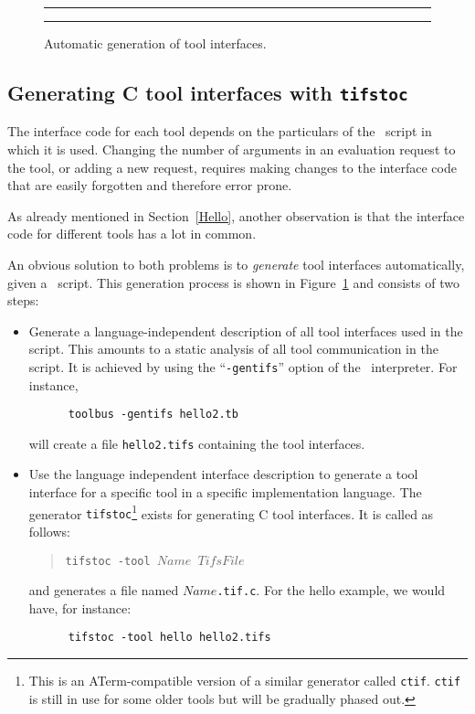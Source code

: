 \documentclass[twoside]{article} %
\begin{document}
\begin{figure}[h]
\rule{\textwidth}{0.5mm}
    
  \centerline{\box\graph}
  \caption{Automatic generation of tool interfaces.}
  \label{fig:Tifs}
\rule{\textwidth}{0.5mm}
\end{figure}

\subsection{\label{tifstoc}Generating C tool interfaces with {\tt tifstoc}}

The interface code for each tool depends on the particulars
of the \T\ script in which it is used. Changing the number
of arguments in an evaluation request to the tool,
or adding a new request, requires making changes to the interface
code that are easily forgotten and therefore error prone.

As already mentioned in Section~\ref{Hello}, another observation
is that the interface code for different tools has a lot in common.

An obvious solution to both problems is to {\em generate}
tool interfaces automatically, given a \T\ script.
This generation process is shown in Figure~\ref{fig:Tifs}
and consists of two steps:

\begin{itemize}
\item Generate a language-independent
description of all tool interfaces used in the script.
This amounts to a static analysis of all tool communication
in the script. It is achieved by using the ``{\tt -gentifs}''
option of the \TB\ interpreter. For instance,
\begin{verbatim}
      toolbus -gentifs hello2.tb
\end{verbatim}
will create a file {\tt hello2.tifs} containing the tool interfaces.

\item Use the language independent interface description
to generate a tool interface for a specific tool in a specific
implementation language. The generator {\tt tifstoc}\footnote{
This is an ATerm-compatible version of a similar generator called {\tt ctif}.
{\tt ctif} is still in use for some older tools but will be gradually phased out.}
exists for generating C tool interfaces. It is called as follows:
\begin{quote}
      {\tt tifstoc -tool $Name  $ $TifsFile$}
\end{quote}
and generates a file named {\tt $Name$.tif.c}.
For the hello example, we would have, for instance:
\begin{verbatim}
      tifstoc -tool hello hello2.tifs
\end{verbatim}
\end{itemize}
\end{document}

